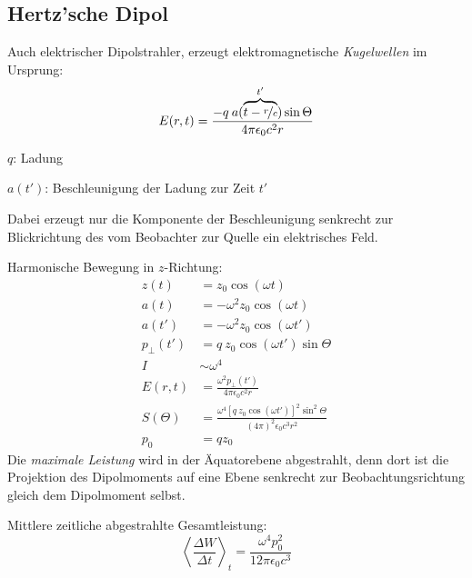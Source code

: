 	\subsection{Hertz'sche Dipol} %
		Auch elektrischer Dipolstrahler, erzeugt elektromagnetische \emph{Kugelwellen} im Ursprung:
		\begin{equation*}
			E(r,t) = \frac{-q\:a(\overbrace{t-\nicefrac r c}^{t'}) \sin \Theta}{4\pi\epsilon_0 c^2 r}
		\end{equation*}
		\begin{tightitemize}
			\item[$q$:] Ladung
			\item[$a(t')$:] Beschleunigung der Ladung zur Zeit $t'$
		\end{tightitemize}
		Dabei erzeugt nur die Komponente der Beschleunigung senkrecht zur
		Blickrichtung des vom Beobachter zur Quelle ein elektrisches Feld.
		
		Harmonische Bewegung in $z$-Richtung:
		\begin{align*}
			z(t) &= z_0 \cos(\omega t) \\
			a(t) &= -\omega^2 z_0 \cos (\omega t)\\
			a(t') &= -\omega^2 z_0 \cos (\omega t') \\
			p_\perp(t') &= q\:z_0 \cos(\omega t') \sin \Theta \\
			I&\sim \omega^4 \\
			E(r,t) &= \frac{\omega^2 p_\perp(t')}{4\pi \epsilon_0 c^2 r} \\
			S(\Theta) &= \frac{\omega^4 [q\:z_0 \cos(\omega t')]^2 \sin^2 \Theta}{(4\pi)^2 \epsilon_0 c^3 r^2} \\
			p_0 &= q z_0
		\end{align*}
		Die \emph{maximale Leistung} wird in der Äquatorebene abgestrahlt, denn
		dort ist die Projektion des Dipolmoments auf eine Ebene senkrecht zur
		Beobachtungsrichtung gleich dem Dipolmoment selbst.
		
		Mittlere zeitliche abgestrahlte Gesamtleistung:
		\begin{equation*}
			\left<\frac{\Delta W}{\Delta t}\right>_t = \frac{\omega^4 p_0^2}{12 \pi \epsilon_0 c^3}
		\end{equation*}
